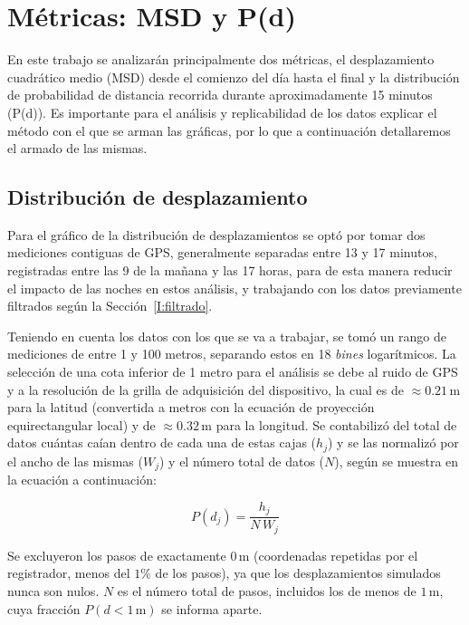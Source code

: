 \section{Métricas: MSD y P(d)}\label{I:metricas}

En este trabajo se analizarán principalmente dos métricas, el desplazamiento cuadrático medio (MSD) desde el comienzo del día hasta el final y la distribución de
probabilidad de distancia recorrida durante aproximadamente 15 minutos (P(d)). Es importante para el análisis y replicabilidad de los datos explicar el método 
con el que se arman las gráficas, por lo que a continuación detallaremos el armado de las mismas.

\subsection{Distribución de desplazamiento}

Para el gráfico de la distribución de desplazamientos se optó por tomar dos mediciones contiguas de GPS, generalmente separadas entre 13 y 17 minutos, registradas entre las
9 de la mañana y las 17 horas, para de esta manera reducir el impacto de las noches en estos análisis, y trabajando con los datos previamente filtrados según 
la Sección~\ref{I:filtrado}. 

Teniendo en cuenta los datos con los que se va a trabajar, se tomó un rango de mediciones de entre 1 y 100 metros, separando estos en 18 \textit{bines} logarítmicos. 
La selección de una cota inferior de 1 metro para el análisis se debe al ruido de GPS y a la resolución de la grilla de adquisición del dispositivo, la cual es de 
$\approx 0.21\,\text{m}$ para la latitud (convertida a metros con la ecuación de proyección equirectangular local) y de $\approx 0.32\,\text{m}$ para la longitud.
Se contabilizó del total de datos cuántas caían dentro de cada una de estas cajas ($h_j$) y se las normalizó por el ancho de las mismas ($W_j$) y el número total de datos ($N$), 
según se muestra en la ecuación a continuación:

\begin{equation*}
    P(d_j) = \frac{h_j}{N \, W_j}
\end{equation*}

Se excluyeron los pasos de exactamente $0\,\text{m}$ (coordenadas repetidas por el registrador, menos del $1 \%$ de los pasos), ya que los desplazamientos simulados nunca 
son nulos. $N$ es el número total de pasos, incluidos los de menos de $1\,\text{m}$, cuya fracción $P(d<1\,\text{m})$ se informa aparte.

